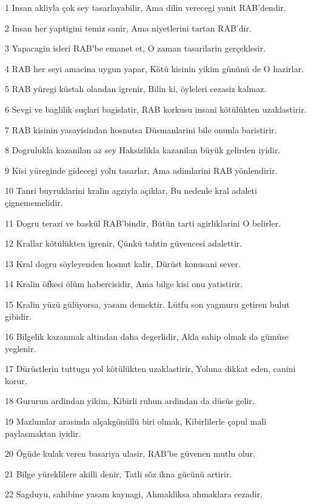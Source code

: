 \par 1 Insan akliyla çok sey tasarlayabilir, Ama dilin verecegi yanit RAB'dendir.
\par 2 Insan her yaptigini temiz sanir, Ama niyetlerini tartan RAB'dir.
\par 3 Yapacagin isleri RAB'be emanet et, O zaman tasarilarin gerçeklesir.
\par 4 RAB her seyi amacina uygun yapar, Kötü kisinin yikim gününü de O hazirlar.
\par 5 RAB yüregi küstah olandan igrenir, Bilin ki, öyleleri cezasiz kalmaz.
\par 6 Sevgi ve baglilik suçlari bagislatir, RAB korkusu insani kötülükten uzaklastirir.
\par 7 RAB kisinin yasayisindan hosnutsa Düsmanlarini bile onunla baristirir.
\par 8 Dogrulukla kazanilan az sey Haksizlikla kazanilan büyük gelirden iyidir.
\par 9 Kisi yüreginde gidecegi yolu tasarlar, Ama adimlarini RAB yönlendirir.
\par 10 Tanri buyruklarini kralin agziyla açiklar, Bu nedenle kral adaleti çignememelidir.
\par 11 Dogru terazi ve baskül RAB'bindir, Bütün tarti agirliklarini O belirler.
\par 12 Krallar kötülükten igrenir, Çünkü tahtin güvencesi adalettir.
\par 13 Kral dogru söyleyenden hosnut kalir, Dürüst konusani sever.
\par 14 Kralin öfkesi ölüm habercisidir, Ama bilge kisi onu yatistirir.
\par 15 Kralin yüzü gülüyorsa, yasam demektir. Lütfu son yagmuru getiren bulut gibidir.
\par 16 Bilgelik kazanmak altindan daha degerlidir, Akla sahip olmak da gümüse yeglenir.
\par 17 Dürüstlerin tuttugu yol kötülükten uzaklastirir, Yoluna dikkat eden, canini korur.
\par 18 Gururun ardindan yikim, Kibirli ruhun ardindan da düsüs gelir.
\par 19 Mazlumlar arasinda alçakgönüllü biri olmak, Kibirlilerle çapul mali paylasmaktan iyidir.
\par 20 Ögüde kulak veren basariya ulasir, RAB'be güvenen mutlu olur.
\par 21 Bilge yüreklilere akilli denir, Tatli söz ikna gücünü artirir.
\par 22 Sagduyu, sahibine yasam kaynagi, Ahmakliksa ahmaklara cezadir.
